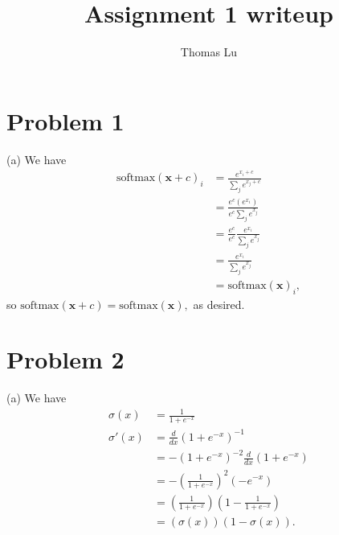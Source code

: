 \documentclass{article}
\title{Assignment 1 writeup}
\author{Thomas Lu}
\date{}
\begin{document}
\maketitle
\section{Problem 1}
(a) We have
\begin{align*}
\text{softmax}(\mathbf{x} + c)_i &= \frac{e^{x_i + c}}{\sum_j e^{x_j + c}}\\
&= \frac{e^c(e^{x_i})}{e^c\sum_j e^{x_j}}\\
&= \frac{e^c}{e^c} \frac{e^{x_i}}{\sum_j e^{x_j}}\\
&= \frac{e^{x_i}}{\sum_je^{x_j}}\\
&= \text{softmax}(\mathbf{x})_i,
\end{align*}
so $\text{softmax}(\mathbf{x} + c) = \text{softmax}(\mathbf{x}),$ as desired.

\section{Problem 2}
(a) We have
\begin{align*}
\sigma(x) &= \frac{1}{1 + e^{-x}}\\
\sigma'(x) &= \frac{d}{dx} (1 + e^{-x})^{-1}\\
&=  -(1 + e^{-x})^{-2}\frac{d}{dx}\left(1 + e^{-x}\right) \\
&= -\left(\frac{1}{1 + e^{-x}}\right)^2 \left(-e^{-x}\right)\\
&= \left(\frac{1}{1 + e^{-x}}\right)\left(1 - \frac{1}{1 + e^{-x}}\right)\\
&= \left(\sigma(x)\right)\left(1 - \sigma(x)\right).
\end{align*}
\end{document}
